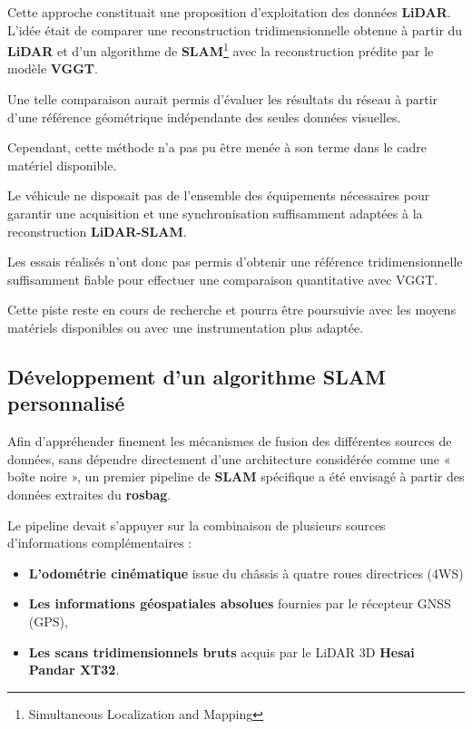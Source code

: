 \documentclass[12pt,a4paper,oneside]{report}
\begin{document}
\hspace*{1cm}Cette approche constituait une proposition d'exploitation des données \textbf{LiDAR}. L'idée était de comparer une reconstruction tridimensionnelle obtenue à partir du \textbf{LiDAR} et d'un algorithme de \textbf{SLAM}\footnote{Simultaneous Localization and Mapping} avec la reconstruction prédite par le modèle \textbf{VGGT}.\vspace{0.01cm}

\hspace*{0.5cm}Une telle comparaison aurait permis d'évaluer les résultats du réseau à partir d'une référence géométrique indépendante des seules données visuelles.\vspace{0.05cm}

\hspace*{1cm}Cependant, cette méthode n'a pas pu être menée à son terme dans le cadre matériel disponible.\vspace{0.01cm}

\hspace*{0.5cm}Le véhicule ne disposait pas de l'ensemble des équipements nécessaires pour garantir une acquisition et une synchronisation suffisamment adaptées à la reconstruction \textbf{LiDAR-SLAM}. \vspace{0.01cm}

\hspace*{0.5cm}Les essais réalisés n'ont donc pas permis d'obtenir une référence tridimensionnelle suffisamment fiable pour effectuer une comparaison quantitative avec VGGT. \vspace{0.01cm}

\hspace*{0.5cm}Cette piste reste en cours de recherche et pourra être poursuivie avec les moyens matériels disponibles ou avec une instrumentation plus adaptée.
\subsection{Développement d'un algorithme SLAM personnalisé}

\hspace*{1cm}Afin d'appréhender finement les mécanismes de fusion des différentes sources de données, sans dépendre directement d'une architecture considérée comme une « boîte noire », un premier pipeline de \textbf{SLAM} spécifique a été envisagé à partir des données extraites du \textbf{rosbag}.\vspace{0.1cm}

\hspace*{1cm}Le pipeline devait s'appuyer sur la combinaison de plusieurs sources d'informations complémentaires :
\begin{itemize}[leftmargin=2cm, label=\textbullet, itemsep=0.4em]
    \item\textbf{L'odométrie cinématique} issue du châssis à quatre roues directrices (4WS)
    \item\textbf{Les informations géospatiales absolues} fournies par le récepteur GNSS (GPS),
    \item\textbf{Les scans tridimensionnels bruts} acquis par le LiDAR 3D \textbf{Hesai Pandar XT32}.
\end{itemize}
\end{document}
